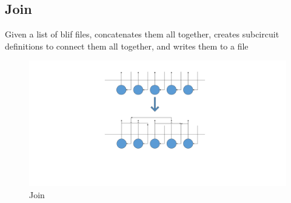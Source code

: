 \documentclass[12pt,final,oneside]{dwThesis} %
\begin{document}
   \newpage 
   \subsection{Join}
   \label{algJoin} Given a list of blif files,
   concatenates them all together, creates subcircuit definitions to connect
   them all together, and writes them to a file 
   \begin{figure}

      \begin{center}

         \includegraphics[width=\linewidth]{images/Join.pdf} \caption{Join}
         \label{imJoin} 
      \end{center}

   \end{figure}

   \newpage 
\end{document}
